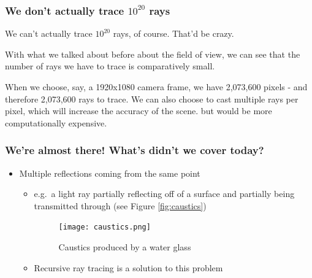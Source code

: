 \documentclass[12pt]{beamer}
\begin{document}
  \begin{frame}
    \frametitle{We don't actually trace $10^{20}$ rays}

    We can't actually trace $10^{20}$ rays, of course.
    That'd be crazy.

    With what we talked about before about the field of view, we can see that the number of rays we have to trace is comparatively small.

    When we choose, say, a 1920x1080 camera frame, we have 2,073,600 pixels - and therefore 2,073,600 rays to trace.
    We can also choose to cast multiple rays per pixel, which will increase the accuracy of the scene.
    but would be more computationally expensive.


  \end{frame}

  \begin{frame}
    \frametitle{We're almost there! What's didn't we cover today?}

    \begin{itemize}
      \item Multiple reflections coming from the same point
      \begin{itemize}
        \item e.g.\ a light ray partially reflecting off of a surface and partially being transmitted through (see Figure \autoref{fig:caustics})

        \begin{figure}
          \centering
          \texttt{[image: caustics.png]}
          \caption{Caustics produced by a water glass}
          \label{fig:caustics}
        \end{figure}

        \item Recursive ray tracing is a solution to this problem

      \end{itemize}

    \end{itemize}

  \end{frame}
\end{document}
